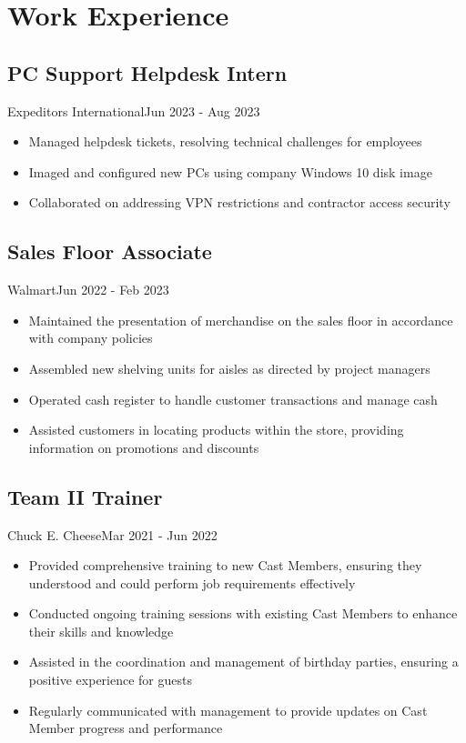 \section{Work Experience}

\subsection{PC Support Helpdesk Intern}{Expeditors International}{Jun 2023 - Aug 2023}
\begin{itemize}
    \item Managed helpdesk tickets, resolving technical challenges for employees
    \item Imaged and configured new PCs using company Windows 10 disk image
    \item Collaborated on addressing VPN restrictions and contractor access security
\end{itemize}

\subsection{Sales Floor Associate}{Walmart}{Jun 2022 - Feb 2023}
\begin{itemize}
    \item Maintained the presentation of merchandise on the sales floor in accordance with company policies
    \item Assembled new shelving units for aisles as directed by project managers
    \item Operated cash register to handle customer transactions and manage cash
    \item Assisted customers in locating products within the store, providing information on promotions and discounts
\end{itemize}

\subsection{Team II Trainer}{Chuck E. Cheese}{Mar 2021 - Jun 2022}
\begin{itemize}
    \item Provided comprehensive training to new Cast Members, ensuring they understood and could perform job requirements effectively
    \item Conducted ongoing training sessions with existing Cast Members to enhance their skills and knowledge
    \item Assisted in the coordination and management of birthday parties, ensuring a positive experience for guests
    \item Regularly communicated with management to provide updates on Cast Member progress and performance
\end{itemize}
